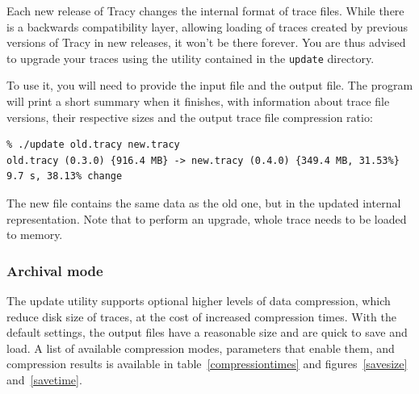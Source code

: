 \documentclass[hidelinks,titlepage,a4paper]{article}
\begin{document}
Each new release of Tracy changes the internal format of trace files. While there is a backwards compatibility layer, allowing loading of traces created by previous versions of Tracy in new releases, it won't be there forever. You are thus advised to upgrade your traces using the utility contained in the \texttt{update} directory.

To use it, you will need to provide the input file and the output file. The program will print a short summary when it finishes, with information about trace file versions, their respective sizes and the output trace file compression ratio:

\begin{verbatim}
% ./update old.tracy new.tracy
old.tracy (0.3.0) {916.4 MB} -> new.tracy (0.4.0) {349.4 MB, 31.53%}  9.7 s, 38.13% change
\end{verbatim}

The new file contains the same data as the old one, but in the updated internal representation. Note that to perform an upgrade, whole trace needs to be loaded to memory.

\subsubsection{Archival mode}

The update utility supports optional higher levels of data compression, which reduce disk size of traces, at the cost of increased compression times. With the default settings, the output files have a reasonable size and are quick to save and load. A list of available compression modes, parameters that enable them, and compression results is available in table~\ref{compressiontimes} and figures~\ref{savesize} and~\ref{savetime}.
\end{document}
